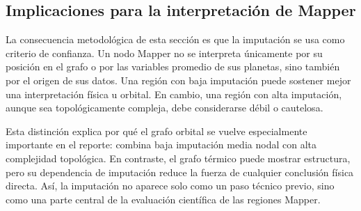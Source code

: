 \subsection*{Implicaciones para la interpretación de Mapper}

La consecuencia metodológica de esta sección es que la imputación se usa como criterio de confianza. Un nodo Mapper no se interpreta únicamente por su posición en el grafo o por las variables promedio de sus planetas, sino también por el origen de sus datos. Una región con baja imputación puede sostener mejor una interpretación física u orbital. En cambio, una región con alta imputación, aunque sea topológicamente compleja, debe considerarse débil o cautelosa.

Esta distinción explica por qué el grafo orbital se vuelve especialmente importante en el reporte: combina baja imputación media nodal con alta complejidad topológica. En contraste, el grafo térmico puede mostrar estructura, pero su dependencia de imputación reduce la fuerza de cualquier conclusión física directa. Así, la imputación no aparece solo como un paso técnico previo, sino como una parte central de la evaluación científica de las regiones Mapper.
